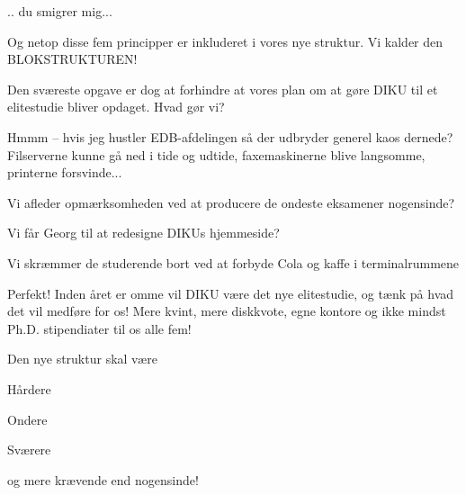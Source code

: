 \documentclass[a4paper,11pt]{article}
\begin{document}
\begin{sketch}
 .. du smigrer mig...

 Og netop disse fem principper er inkluderet i vores nye struktur. Vi
kalder den  BLOKSTRUKTUREN!


 Den sværeste opgave er dog at forhindre at vores plan om at gøre DIKU
til et elitestudie bliver opdaget. Hvad gør vi?

 Hmmm -- hvis jeg hustler EDB-afdelingen så der udbryder generel kaos
dernede? Filserverne kunne gå ned i tide og udtide, faxemaskinerne blive
langsomme, printerne forsvinde...

 Vi afleder opmærksomheden ved at producere de ondeste eksamener
nogensinde?

 Vi får Georg til at redesigne DIKUs hjemmeside?

 Vi skræmmer de studerende bort ved at forbyde Cola og kaffe i
terminalrummene

 Perfekt! Inden året er omme vil DIKU være det nye elitestudie, og tænk
på hvad det vil medføre for os! Mere kvint, mere diskkvote, egne kontore og ikke
mindst Ph.D. stipendiater til os alle fem!


 Den nye struktur skal være 

 Hårdere

 Ondere

 Sværere

 og mere krævende end nogensinde!

 

\end{sketch}
\end{document}
